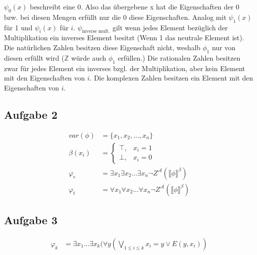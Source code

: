 \documentclass[a4paper,10pt]{article}
\begin{document}
\begin{enumerate}[(i)]
$\psi_0(x)$ beschreibt eine 0. Also das übergebene x hat die Eigenschaften der 0 bzw. bei diesen Mengen erfüllt nur die 0 diese Eigenschaften. Analog mit $\psi_1(x)$ für 1 und $\psi_i(x)$ für $i$. $\psi_{\text{inverse mult.}}$ gilt wenn jedes Element bezüglich der Multiplikation ein inverses Element besitzt (Wenn 1 das neutrale Element ist). Die natürlichen Zahlen besitzen diese Eigenschaft nicht, weshalb $\phi_1$ nur von diesen erfüllt wird ($\mathbb{Z}$ würde auch $\phi_1$ erfüllen.)
Die rationalen Zahlen besitzen zwar für jedes Element ein inverses bzgl. der Multiplikation, aber kein Element mit den Eigenschaften von $i$. Die komplexen Zahlen besitzen ein Element mit den Eigenschaften von $i$.
\end{enumerate}

\subsection*{Aufgabe 2}
\begin{align*}
	var(\phi) &= \{x_1,x_2,...,x_n\} \\
	\beta(x_i) &= 
	\begin{cases}
	\top, & x_i = 1 \\
	\bot, & x_i = 0
	\end{cases} \\
	\varphi_e &= \exists x_1 \exists x_2 ...\exists x_n \neg Z^{\mathcal{A}}( \llbracket \phi \rrbracket^{\beta}) \\
	\varphi_t &= \forall x_1 \forall x_2 ...\forall x_n \neg Z^{\mathcal{A}}( \llbracket \phi \rrbracket^{\beta})
\end{align*}

\subsection*{Aufgabe 3}
\begin{align*}
	\varphi_k &= \exists x_1...\exists x_k(\forall y( \bigvee_{1 \le i \le k} x_i = y \lor E(y,x_i))
\end{align*}
\end{document}
